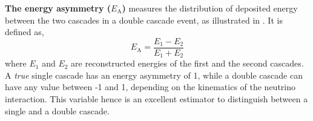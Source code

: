 \textbf{The energy asymmetry ($E_{\text{A}}$)} measures the distribution of deposited energy between the two cascades in a double cascade event, as illustrated in . It is defined as,
\begin{equation}\label{eq:EA}
    E_{\mathrm{A}} = \frac{E_1-E_2}{E_1+E_2}
\end{equation}
where $E_1$ and $E_2$ are reconstructed energies of the first and the second cascades. A \emph{true} single cascade has an energy asymmetry of 1, while a double cascade can have any value between -1 and 1, depending on the kinematics of the neutrino interaction. This variable hence is an excellent estimator to distinguish between a single and a double cascade.

